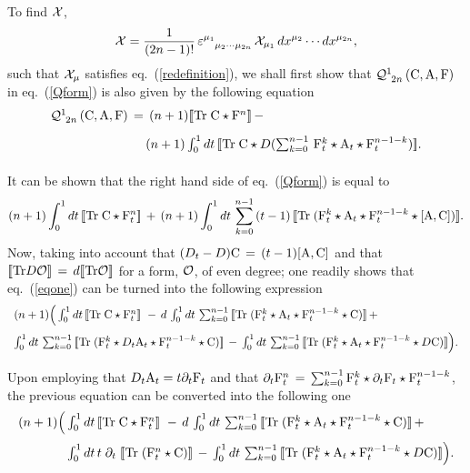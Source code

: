 \documentclass[a4paper,12pt]{article}
\def\cO{{\cal O}}
\def\cQ{{\cal Q}}
\def\cX{{\cal X}}
\def\A{{\rm A}}
\def\C{{\rm C}}
\def\F{{\rm F}}
\def\bracl{ [\!\!\, [}
\def\bracr{ ]\!\!\, ]}
\begin{document}
 To find $\cX$, 
\begin{equation}
{\cX}=\frac{1}{(2n-1)!}\,
\varepsilon^{\mu_1}_{\phantom{\mu_1}\mu_2\cdots\mu_{2n}}\,
\cX_{\mu_1}\,dx^{\mu_2}\cdots dx^{\mu_{2n}},
\label{Xform}
\end{equation}
such that $\cX_{\mu}$ satisfies eq.~(\ref{redefinition}), we shall first
show that $\cQ^{1}_{\;\,2n}\,(\C,\A,\F)$ in eq.~(\ref{Qform}) is also
given by the following equation 
\begin{equation}
\begin{array}{l}
{\cQ^{1}_{\;\,2n}\,(\C,\A,\F)\,=\,(n+1)\bracl{\rm Tr}\;\C\star \F^n\bracr\,-\,}
\\[9pt]
{\phantom{\cQ^{1}_{\;\,2n}\,(\C,\A,\F)\,=\,}
(n+1)\int_{0}^{1}dt\,\bracl{\rm Tr}\;\C\star D(
\sum_{k=0}^{n-1}\,\F_t^{k}\star\A_t\star \F_t^{n-1-k})\bracr.}\\[9pt]
\end{array}
\label{newexpression}
\end{equation}
It can be shown that the right hand side of eq.~(\ref{Qform}) is equal to
\begin{equation}
(n+1)\int_{0}^{1}dt\,\bracl{\rm Tr}\;\C\star \F_t^n\bracr\,+\,
(n+1)\int_{0}^{1}dt\,\sum_{k=0}^{n-1}\,(t-1)\,\bracl{\rm Tr}\;
(\F_t^{k}\star\A_t\star \F_t^{n-1-k}\star[\A,\C])\bracr.
\label{eqone}
\end{equation}
Now, taking into account that $(D_t-D)\C\,=\,(t-1)[\A,\C]$ and that 
$\bracl{\rm Tr} D\cO\bracr\,=\,d\bracl{\rm Tr} \cO\bracr$ for a form,  
$\cO$, of even degree; one readily shows that eq.~(\ref{eqone}) can
be turned into the following expression
\begin{displaymath}
\begin{array}{l}
{(n+1)\Big(\int_{0}^{1}dt\,\bracl{\rm Tr}\;\C\star \F_t^n\bracr\,
\,-\, d\,\int_{0}^{1}dt\,\sum_{k=0}^{n-1}\,\bracl{\rm Tr}\;
(\F_t^{k}\star\A_t\star \F_t^{n-1-k}\star\C)\bracr\,+\,}\\[9pt] 
{\int_{0}^{1}dt\,\sum_{k=0}^{n-1}\,\bracl{\rm Tr}\;
(\F_t^{k}\star D_t\A_t\star \F_t^{n-1-k}\star\C)\bracr\,-\,
\int_{0}^{1}dt\,\sum_{k=0}^{n-1}\,\bracl{\rm Tr}\;
(\F_t^{k}\star \A_t\star \F_t^{n-1-k}\star D\C)\bracr\Big).}\\[9pt] 
\end{array}
\end{displaymath}
Upon employing that $D_t\A_t=t\partial_t\F_t$ and that $\partial_t\F_t^n\,=\,
\sum_{k=0}^{n-1}\F_t^{k}\star\partial_t\F_t \star \F_t^{n-1-k}$, 
the previous equation can be converted into the following one
\begin{displaymath}
\begin{array}{l}
{(n+1)\Big(\int_{0}^{1}dt\,\bracl{\rm Tr}\;\C\star \F_t^n\bracr\,
\,-\, d\,\int_{0}^{1}dt\,\sum_{k=0}^{n-1}\,\bracl{\rm Tr}\;
(\F_t^{k}\star\A_t\star \F_t^{n-1-k}\star\C)\bracr\,+\,}\\[9pt] 
{\phantom{(n+1)\Big(}\int_{0}^{1}dt\,t\; \partial_t\;\bracl{\rm Tr}\;
(\F_t^n\star\C)\bracr\,-\,
\int_{0}^{1}dt\,\sum_{k=0}^{n-1}\,\bracl{\rm Tr}\;
(\F_t^{k}\star \A_t\star \F_t^{n-1-k}\star D\C)\bracr\Big).}\\[9pt] 
\end{array}
\end{displaymath}
\end{document}
